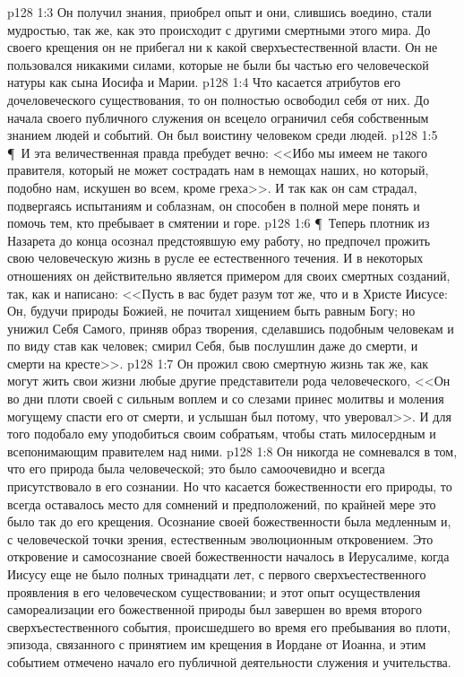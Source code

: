 \vs p128 1:3 Он получил знания, приобрел опыт и они, слившись воедино, стали мудростью, так же, как это происходит с другими смертными этого мира. До своего крещения он не прибегал ни к какой сверхъестественной власти. Он не пользовался никакими силами, которые не были бы частью его человеческой натуры как сына Иосифа и Марии.
\vs p128 1:4 Что касается атрибутов его дочеловеческого существования, то он полностью освободил себя от них. До начала своего публичного служения он всецело ограничил себя собственным знанием людей и событий. Он был воистину человеком среди людей.
\vs p128 1:5 \P\ И эта величественная правда пребудет вечно: <<Ибо мы имеем не такого правителя, который не может сострадать нам в немощах наших, но который, подобно нам, искушен во всем, кроме греха>>. И так как он сам страдал, подвергаясь испытаниям и соблазнам, он способен в полной мере понять и помочь тем, кто пребывает в смятении и горе.
\vs p128 1:6 \P\ Теперь плотник из Назарета до конца осознал предстоявшую ему работу, но предпочел прожить свою человеческую жизнь в русле ее естественного течения. И в некоторых отношениях он действительно является примером для своих смертных созданий, так, как и написано: <<Пусть в вас будет разум тот же, что и в Христе Иисусе: Он, будучи природы Божией, не почитал хищением быть равным Богу; но унижил Себя Самого, приняв образ творения, сделавшись подобным человекам и по виду став как человек; смирил Себя, быв послушлин даже до смерти, и смерти на кресте>>.
\vs p128 1:7 Он прожил свою смертную жизнь так же, как могут жить свои жизни любые другие представители рода человеческого, <<Он во дни плоти своей с сильным воплем и со слезами принес молитвы и моления могущему спасти его от смерти, и услышан был потому, что уверовал>>. И для того подобало ему  уподобиться своим собратьям, чтобы стать милосердным и всепонимающим правителем над ними.
\vs p128 1:8 Он никогда не сомневался в том, что его природа была человеческой; это было самоочевидно и всегда присутствовало в его сознании. Но что касается божественности его природы, то всегда оставалось место для сомнений и предположений, по крайней мере это было так до его крещения. Осознание своей божественности была медленным и, с человеческой точки зрения, естественным эволюционным откровением. Это откровение и самосознание своей божественности началось в Иерусалиме, когда Иисусу еще не было полных тринадцати лет, с первого сверхъестественного проявления в его человеческом существовании; и этот опыт осуществления самореализации его божественной природы был завершен во время второго сверхъестественного события, происшедшего во время его пребывания во плоти, эпизода, связанного с принятием им крещения в Иордане от Иоанна, и этим событием отмечено начало его публичной деятельности служения и учительства.
